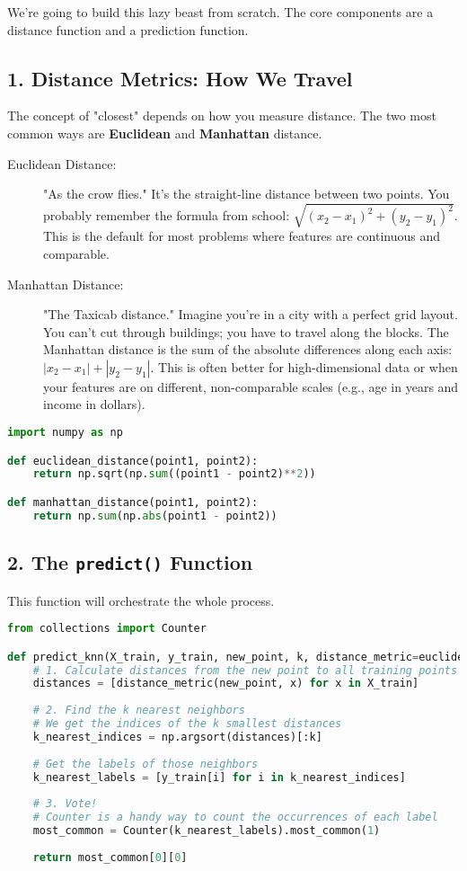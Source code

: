 \documentclass[11pt, letterpaper, openany]{book}
\begin{document}
We're going to build this lazy beast from scratch. The core components are a distance function and a prediction function.

\subsection{1. Distance Metrics: How We Travel}

The concept of "closest" depends on how you measure distance. The two most common ways are \textbf{Euclidean} and \textbf{Manhattan} distance.

\begin{description}
    \item[Euclidean Distance:] "As the crow flies." It's the straight-line distance between two points. You probably remember the formula from school: $\sqrt{(x_2 - x_1)^2 + (y_2 - y_1)^2}$. This is the default for most problems where features are continuous and comparable.
    \item[Manhattan Distance:] "The Taxicab distance." Imagine you're in a city with a perfect grid layout. You can't cut through buildings; you have to travel along the blocks. The Manhattan distance is the sum of the absolute differences along each axis: $|x_2 - x_1| + |y_2 - y_1|$. This is often better for high-dimensional data or when your features are on different, non-comparable scales (e.g., age in years and income in dollars).
\end{description}

\begin{lstlisting}[language=Python]
import numpy as np

def euclidean_distance(point1, point2):
    return np.sqrt(np.sum((point1 - point2)**2))

def manhattan_distance(point1, point2):
    return np.sum(np.abs(point1 - point2))
\end{lstlisting}

\subsection{2. The \texttt{predict()} Function}

This function will orchestrate the whole process.

\begin{lstlisting}[language=Python]
from collections import Counter

def predict_knn(X_train, y_train, new_point, k, distance_metric=euclidean_distance):
    # 1. Calculate distances from the new point to all training points
    distances = [distance_metric(new_point, x) for x in X_train]
    
    # 2. Find the k nearest neighbors
    # We get the indices of the k smallest distances
    k_nearest_indices = np.argsort(distances)[:k]
    
    # Get the labels of those neighbors
    k_nearest_labels = [y_train[i] for i in k_nearest_indices]
    
    # 3. Vote!
    # Counter is a handy way to count the occurrences of each label
    most_common = Counter(k_nearest_labels).most_common(1)
    
    return most_common[0][0]
\end{lstlisting}
\end{document}
